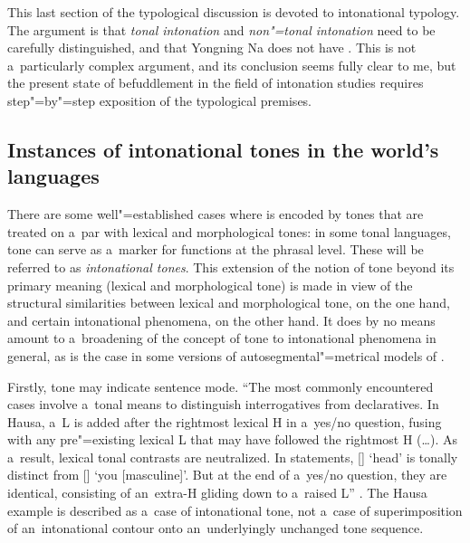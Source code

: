 
This last section of the typological discussion is devoted to intonational typology. The argument is that \textit{tonal intonation} and \textit{non"=tonal intonation} need to be carefully distinguished, and that Yongning Na does not have . This is not a~particularly complex argument, and its conclusion seems fully clear to me, but the present state of befuddlement in the field of intonation studies requires step"=by"=step exposition of the typological premises.

\subsection{Instances of intonational tones in the world’s languages}
\label{sec:instancesofintonationaltonesintheworldslanguages}

There are some well"=established cases where  is encoded by tones that are treated on a~par
with lexical and morphological tones: in some tonal languages, tone can serve as a~marker for
functions at the phrasal level. These will be referred to as \textit{intonational tones}. This
extension of the notion of tone beyond its primary meaning (lexical and morphological tone) is made
in view of the structural similarities between lexical and morphological tone, on the one hand, and
certain intonational phenomena, on the other hand. It does by no means amount to a~broadening of the
concept of tone to intonational phenomena in general, as is the case in some versions of
autosegmental"=metrical models of .

Firstly, tone may indicate sentence mode. “The most commonly encountered cases involve a~tonal means
to distinguish interrogatives from declaratives. In Hausa, a~L is added after the rightmost lexical
H in a~yes/no {question}, fusing with any pre"=existing lexical L that may have followed the rightmost
H ({\dots}). As a~result, lexical tonal contrasts are neutralized. In statements, [] ‘head’ is
tonally distinct from [] ‘you [masculine]’. But at the end of a~yes/no {question}, they are
identical, consisting of an~extra-H gliding down to a~raised L” \citep[61]{hymanetal2000}. The Hausa
example is described as a~case of intonational tone, not a~case of superimposition of
an~intonational {contour} onto an~underlyingly unchanged tone sequence.

